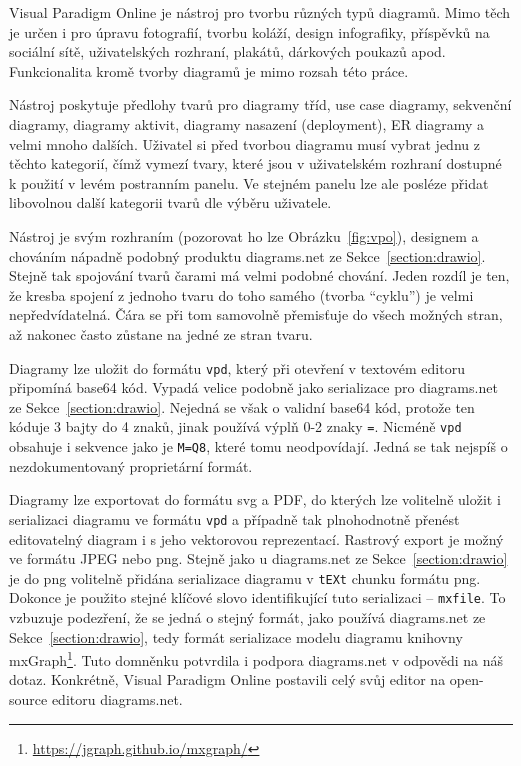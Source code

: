Visual Paradigm Online je nástroj pro tvorbu různých typů diagramů.
Mimo těch je určen i pro úpravu fotografií, tvorbu koláží, design infografiky, příspěvků na sociální sítě, uživatelských rozhraní, plakátů, dárkových poukazů apod.
Funkcionalita kromě tvorby diagramů je mimo rozsah této práce.

Nástroj poskytuje předlohy tvarů pro diagramy tříd, use case diagramy, sekvenční diagramy, diagramy aktivit, diagramy nasazení (deployment), ER diagramy a velmi mnoho dalších.
Uživatel si před tvorbou diagramu musí vybrat jednu z těchto kategorií, čímž vymezí tvary, které jsou v uživatelském rozhraní dostupné k použití v levém postranním panelu.
Ve stejném panelu lze ale posléze přidat libovolnou další kategorii tvarů dle výběru uživatele.

Nástroj je svým rozhraním (pozorovat ho lze Obrázku~\ref{fig:vpo}), designem a chováním nápadně podobný produktu diagrams.net ze Sekce~\ref{section:drawio}.
Stejně tak spojování tvarů čarami má velmi podobné chování.
Jeden rozdíl je ten, že kresba spojení z jednoho tvaru do toho samého (tvorba \enquote{cyklu}) je velmi nepředvídatelná.
Čára se při tom samovolně přemisťuje do všech možných stran, až nakonec často zůstane na jedné ze stran tvaru.

Diagramy lze uložit do formátu \texttt{vpd}, který při otevření v textovém editoru připomíná base64 kód.
Vypadá velice podobně jako serializace pro diagrams.net ze Sekce~\ref{section:drawio}.
Nejedná se však o validní base64 kód, protože ten kóduje 3 bajty do 4 znaků, jinak používá výplň 0-2 znaky \texttt{=}.
Nicméně \texttt{vpd} obsahuje i sekvence jako je \texttt{M=Q8}, které tomu neodpovídají.
Jedná se tak nejspíš o nezdokumentovaný proprietární formát.

Diagramy lze exportovat do formátu \acrshort{svg} a PDF, do kterých lze volitelně uložit i serializaci diagramu ve formátu \texttt{vpd} a případně tak plnohodnotně přenést editovatelný diagram i s jeho vektorovou reprezentací.
Rastrový export je možný ve formátu JPEG nebo \acrshort{png}.
Stejně jako u diagrams.net ze Sekce~\ref{section:drawio} je do \acrshort{png} volitelně přidána serializace diagramu v \texttt{tEXt} chunku formátu \acrshort{png}.
Dokonce je použito stejné klíčové slovo identifikující tuto serializaci -- \texttt{mxfile}.
To vzbuzuje podezření, že se jedná o stejný formát, jako používá diagrams.net ze Sekce~\ref{section:drawio}, tedy formát serializace modelu diagramu knihovny mxGraph\footnote{\url{https://jgraph.github.io/mxgraph/}}.
Tuto domněnku potvrdila i podpora diagrams.net v odpovědi na náš dotaz.
Konkrétně, Visual Paradigm Online postavili celý svůj editor na open-source editoru diagrams.net.

